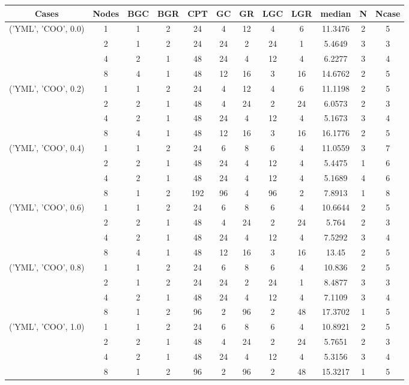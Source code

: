 \begin{tabular}{cccccccccccc}
\hline
Cases & Nodes& BGC& BGR& CPT& GC& GR& LGC& LGR& median & N & Ncase \\
\hline
\multirow{4}{*}{('YML', 'COO', 0.0)}& 1& 1& 2& 24& 4& 12& 4& 6& 11.3476& 2& 5\\
& 2& 1& 2& 24& 24& 2& 24& 1& 5.4649& 3& 3\\
& 4& 2& 1& 48& 24& 4& 12& 4& 6.2277& 3& 4\\
& 8& 4& 1& 48& 12& 16& 3& 16& 14.6762& 2& 5\\
\hline
\multirow{4}{*}{('YML', 'COO', 0.2)}& 1& 1& 2& 24& 4& 12& 4& 6& 11.1198& 2& 5\\
& 2& 2& 1& 48& 4& 24& 2& 24& 6.0573& 2& 3\\
& 4& 2& 1& 48& 24& 4& 12& 4& 5.1673& 3& 4\\
& 8& 4& 1& 48& 12& 16& 3& 16& 16.1776& 2& 5\\
\hline
\multirow{4}{*}{('YML', 'COO', 0.4)}& 1& 1& 2& 24& 6& 8& 6& 4& 11.0559& 3& 7\\
& 2& 2& 1& 48& 24& 4& 12& 4& 5.4475& 1& 6\\
& 4& 2& 1& 48& 24& 4& 12& 4& 5.1689& 4& 6\\
& 8& 1& 2& 192& 96& 4& 96& 2& 7.8913& 1& 8\\
\hline
\multirow{4}{*}{('YML', 'COO', 0.6)}& 1& 1& 2& 24& 6& 8& 6& 4& 10.6644& 2& 5\\
& 2& 2& 1& 48& 4& 24& 2& 24& 5.764& 2& 3\\
& 4& 2& 1& 48& 24& 4& 12& 4& 7.5292& 3& 4\\
& 8& 4& 1& 48& 12& 16& 3& 16& 13.45& 2& 5\\
\hline
\multirow{4}{*}{('YML', 'COO', 0.8)}& 1& 1& 2& 24& 6& 8& 6& 4& 10.836& 2& 5\\
& 2& 1& 2& 24& 24& 2& 24& 1& 8.4877& 3& 3\\
& 4& 2& 1& 48& 24& 4& 12& 4& 7.1109& 3& 4\\
& 8& 1& 2& 96& 2& 96& 2& 48& 17.3702& 1& 5\\
\hline
\multirow{4}{*}{('YML', 'COO', 1.0)}& 1& 1& 2& 24& 6& 8& 6& 4& 10.8921& 2& 5\\
& 2& 2& 1& 48& 4& 24& 2& 24& 5.7651& 2& 3\\
& 4& 2& 1& 48& 24& 4& 12& 4& 5.3156& 3& 4\\
& 8& 1& 2& 96& 2& 96& 2& 48& 15.3217& 1& 5\\
\hline
\end{tabular}
